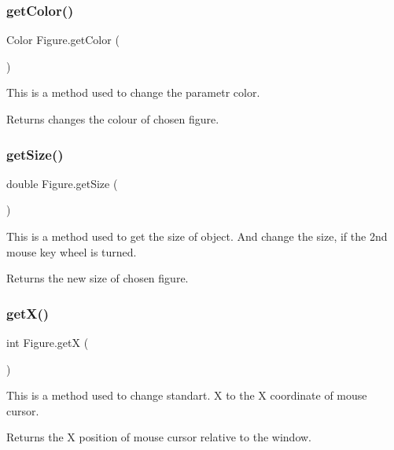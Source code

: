 \subsubsection{\texorpdfstring{getColor()}{getColor()}}
{\footnotesize\ttfamily Color Figure.\+get\+Color (\begin{DoxyParamCaption}{ }\end{DoxyParamCaption})}

This is a method used to change the parametr color. \begin{DoxyReturn}{Returns}
changes the colour of chosen figure. 
\end{DoxyReturn}
\mbox{\label{class_figure_af7805096bd258d3d609009c6459a082b}} 
\subsubsection{\texorpdfstring{getSize()}{getSize()}}
{\footnotesize\ttfamily double Figure.\+get\+Size (\begin{DoxyParamCaption}{ }\end{DoxyParamCaption})}

This is a method used to get the size of object. And change the size, if the 2nd mouse key wheel is turned. \begin{DoxyReturn}{Returns}
the new size of chosen figure. 
\end{DoxyReturn}
\mbox{\label{class_figure_a0d6e3c4fdb516610efa25df8a153b7a4}} 
\subsubsection{\texorpdfstring{getX()}{getX()}}
{\footnotesize\ttfamily int Figure.\+getX (\begin{DoxyParamCaption}{ }\end{DoxyParamCaption})}

This is a method used to change standart. X to the X coordinate of mouse cursor. \begin{DoxyReturn}{Returns}
the X position of mouse cursor relative to the window. 
\end{DoxyReturn}
\mbox{\label{class_figure_adfd5283d53d0885b145d9c65d2f20ac3}} 
